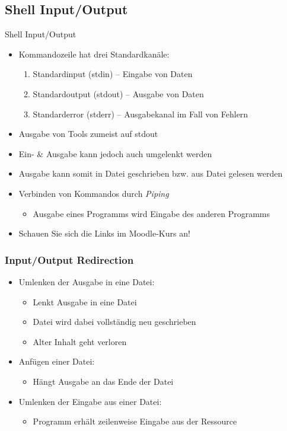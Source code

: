 \documentclass[xcolor=dvipsnames,aspectratio=169]{beamer}
\begin{document}
\subsection{Shell Input/Output}
\begin{frame}{Shell Input/Output}
	\begin{itemize}
		\item Kommandozeile hat drei Standardkanäle:
		\begin{enumerate}
			\item Standardinput (stdin) -- Eingabe von Daten
			\item Standardoutput (stdout) -- Ausgabe von Daten
			\item Standarderror (stderr) -- Ausgabekanal im Fall von Fehlern
		\end{enumerate}
		\item Ausgabe von Tools zumeist auf stdout
		\item Ein- \& Ausgabe kann jedoch auch umgelenkt werden
		\item Ausgabe kann somit in Datei geschrieben bzw. aus Datei gelesen werden
		\item Verbinden von Kommandos durch \emph{Piping}
		\begin{itemize}
			\item Ausgabe eines Programms wird Eingabe des anderen Programms
		\end{itemize}
		\item Schauen Sie sich die Links im Moodle-Kurs an!
	\end{itemize}
\end{frame}

\begin{frame}
	\frametitle{Input/Output Redirection}
\begin{itemize}
	\item Umlenken der Ausgabe in eine Datei: \keys{>}
		\begin{itemize}
			\item Lenkt Ausgabe in eine Datei
			\item Datei wird dabei vollständig neu geschrieben
			\item Alter Inhalt geht verloren
		\end{itemize}
	\item Anfügen einer Datei: \keys{> >}
	\begin{itemize}
		\item Hängt Ausgabe an das Ende der Datei 
	\end{itemize}
	\item Umlenken der Eingabe aus einer Datei: \keys{<}
		\begin{itemize}
			\item Programm erhält zeilenweise Eingabe aus der Ressource
		\end{itemize}
\end{itemize}
\end{frame}
\end{document}
